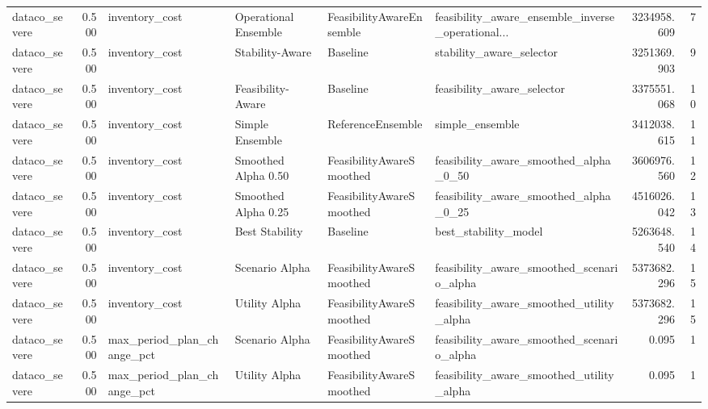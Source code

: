 \begin{table}
{\begin{tabular}{lrllllrr}
 dataco\_severe &             0.500 &              inventory\_cost &  Operational Ensemble &  FeasibilityAwareEnsemble &  feasibility\_aware\_ensemble\_inverse\_operational... &   3234958.609 &               7 \\
 dataco\_severe &             0.500 &              inventory\_cost &       Stability-Aware &                  Baseline &                           stability\_aware\_selector &   3251369.903 &               9 \\
 dataco\_severe &             0.500 &              inventory\_cost &     Feasibility-Aware &                  Baseline &                         feasibility\_aware\_selector &   3375551.068 &              10 \\
 dataco\_severe &             0.500 &              inventory\_cost &       Simple Ensemble &         ReferenceEnsemble &                                    simple\_ensemble &   3412038.615 &              11 \\
 dataco\_severe &             0.500 &              inventory\_cost &   Smoothed Alpha 0.50 &  FeasibilityAwareSmoothed &              feasibility\_aware\_smoothed\_alpha\_0\_50 &   3606976.560 &              12 \\
 dataco\_severe &             0.500 &              inventory\_cost &   Smoothed Alpha 0.25 &  FeasibilityAwareSmoothed &              feasibility\_aware\_smoothed\_alpha\_0\_25 &   4516026.042 &              13 \\
 dataco\_severe &             0.500 &              inventory\_cost &        Best Stability &                  Baseline &                               best\_stability\_model &   5263648.540 &              14 \\
 dataco\_severe &             0.500 &              inventory\_cost &        Scenario Alpha &  FeasibilityAwareSmoothed &          feasibility\_aware\_smoothed\_scenario\_alpha &   5373682.296 &              15 \\
 dataco\_severe &             0.500 &              inventory\_cost &         Utility Alpha &  FeasibilityAwareSmoothed &           feasibility\_aware\_smoothed\_utility\_alpha &   5373682.296 &              15 \\
 dataco\_severe &             0.500 &  max\_period\_plan\_change\_pct &        Scenario Alpha &  FeasibilityAwareSmoothed &          feasibility\_aware\_smoothed\_scenario\_alpha &         0.095 &               1 \\
 dataco\_severe &             0.500 &  max\_period\_plan\_change\_pct &         Utility Alpha &  FeasibilityAwareSmoothed &           feasibility\_aware\_smoothed\_utility\_alpha &         0.095 &               1 \\

\end{tabular}}
\end{table}
